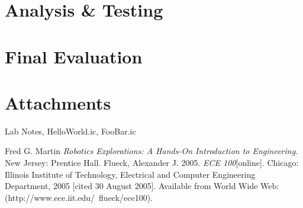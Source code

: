 \documentclass[a4paper, 11pt]{article}
\begin{document}
\ifx

\section*{Analysis \& Testing}
\lipsum[6]

\section*{Final Evaluation}
\lipsum[7]

\section*{Attachments}
Lab Notes, HelloWorld.ic, FooBar.ic

\begin{thebibliography}{9}
 Fred G. Martin \emph{Robotics Explorations: A Hands-On Introduction to Engineering}. New Jersey: Prentice Hall.
  Flueck, Alexander J. 2005. \emph{ECE 100}[online]. Chicago: Illinois Institute of Technology, Electrical and Computer Engineering Department, 2005 [cited 30
August 2005]. Available from World Wide Web: (http://www.ece.iit.edu/~flueck/ece100).
\end{thebibliography}
\fi
\end{document}
